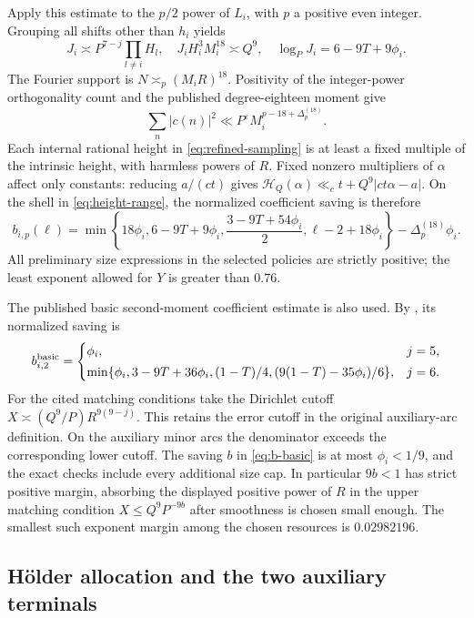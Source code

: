 \documentclass[11pt,letterpaper]{article}
\numberwithin{equation}{section}
\begin{document}
Apply this estimate to the $p/2$ power of $L_i$, with $p$ a positive even
integer.  Grouping all shifts other than $h_i$ yields
\[
 J_i\asymp P^{7-j}\prod_{l\ne i}H_l,
 \quad J_iH_i^3M_i^{18}\asymp Q^9,
 \quad \log_PJ_i=6-9T+9\phi_i.
\]
The Fourier support is $N\asymp_p(M_iR)^{18}$.  Positivity of the
integer-power orthogonality count and the published degree-eighteen
moment give
\[
 \sum_n|c(n)|^2\ll P^\varepsilon M_i^{p-18+\Delta_p^{(18)}}.
\]
Each internal rational height in \eqref{eq:refined-sampling} is at
least a fixed multiple of the intrinsic height, with harmless powers
of $R$.  Fixed nonzero multipliers of $\alpha$ affect only constants:
reducing $a/(ct)$ gives $\mathcal H_Q(\alpha)\ll_c
t+Q^9|ct\alpha-a|$.  On the shell in \eqref{eq:height-range}, the
normalized coefficient saving is therefore
\begin{equation}
 b_{i,p}(\ell)=
 \min\left\{18\phi_i,6-9T+9\phi_i,
      \frac{3-9T+54\phi_i}{2},\ell-2+18\phi_i\right\}
           -\Delta_p^{(18)}\phi_i.
 \label{eq:b-refined}
\end{equation}
All preliminary size expressions in the selected policies are strictly
positive; the least exponent allowed for $Y$ is greater than $0.76$.

The published basic second-moment coefficient estimate is also used.
By \cite[Corollary 4.2.1 and Lemma 4.3]{VW95}, its normalized saving is
\begin{equation}
 b_{i,2}^{\rm basic}=
 \begin{cases}
 \phi_i,&j=5,\\[2pt]
 \min\{\phi_i,3-9T+36\phi_i,(1-T)/4,
                    (9(1-T)-35\phi_i)/6\},&j=6.
 \end{cases}
 \label{eq:b-basic}
\end{equation}
For the cited matching conditions take the Dirichlet cutoff
$X\asymp(Q^9/P)R^{9(9-j)}$. This retains the error cutoff in the
original auxiliary-arc definition. On the auxiliary minor arcs the
denominator exceeds the corresponding lower cutoff. The saving $b$ in
\eqref{eq:b-basic} is at most $\phi_i<1/9$, and the exact checks include
every additional size cap. In particular $9b<1$ has strict positive
margin, absorbing the displayed positive power of $R$ in the upper
matching condition $X\le Q^9P^{-9b}$ after smoothness is chosen small
enough. The smallest such exponent margin among the chosen resources is
$0.02982196$.

\subsection{H\"older allocation and the two auxiliary terminals}
\end{document}
